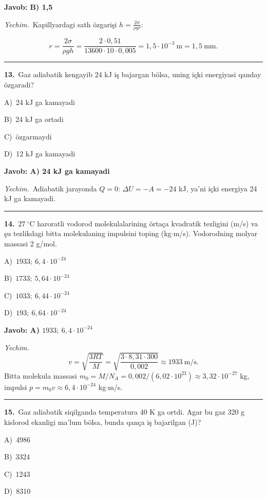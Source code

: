 \documentclass[11pt,a4paper]{article}
\newcommand{\opt}[2]{\hspace*{4mm}#1)\ #2\par}
\begin{document}
\noindent\colorbox{gray!12}{\parbox{\dimexpr\linewidth-2\fboxsep}{\textbf{Javob: B) 1,5}}}\par\smallskip
\noindent\textit{Yechim.}\ Kapillyardagi sath özgarişi $h=\frac{2\sigma}{\rho gr}$:\par
\[r=\frac{2\sigma}{\rho gh}=\frac{2\cdot0{,}51}{13600\cdot10\cdot0{,}005}=1{,}5\cdot10^{-3}\ \text{m}=1{,}5\ \text{mm}.\]\par\medskip\hrule\medskip
{}\noindent\begin{minipage}{\linewidth}
\textbf{13.}\ Gaz adiabatik kengayib 24 kJ iş bajargan bölsa, uning içki energiyasi qanday özgaradi?\par\smallskip
\opt{A}{24 kJ ga kamayadi}
\opt{B}{24 kJ ga ortadi}
\opt{C}{özgarmaydi}
\opt{D}{12 kJ ga kamayadi}
\end{minipage}\vspace{2pt}\par
\noindent\colorbox{gray!12}{\parbox{\dimexpr\linewidth-2\fboxsep}{\textbf{Javob: A) 24 kJ ga kamayadi}}}\par\smallskip
\noindent\textit{Yechim.}\ Adiabatik jarayonda $Q=0$: $\Delta U=-A=-24$ kJ, ya’ni içki energiya 24 kJ ga kamayadi.\par\par\medskip\hrule\medskip
{}\noindent\begin{minipage}{\linewidth}
\textbf{14.}\ $27\ ^\circ$C haroratli vodorod molekulalarining örtaça kvadratik tezligini (m/s) va şu tezlikdagi bitta molekulaning impulsini toping (kg$\cdot$m/s). Vodorodning molyar massasi 2 g/mol.\par\smallskip
\opt{A}{$1933;\ 6{,}4\cdot10^{-24}$}
\opt{B}{$1733;\ 5{,}64\cdot10^{-24}$}
\opt{C}{$1033;\ 6{,}44\cdot10^{-24}$}
\opt{D}{$193;\ 6{,}64\cdot10^{-24}$}
\end{minipage}\vspace{2pt}\par
\noindent\colorbox{gray!12}{\parbox{\dimexpr\linewidth-2\fboxsep}{\textbf{Javob: A) $1933;\ 6{,}4\cdot10^{-24}$}}}\par\smallskip
\noindent\textit{Yechim.}\ \[v=\sqrt{\frac{3RT}{M}}=\sqrt{\frac{3\cdot8{,}31\cdot300}{0{,}002}}\approx1933\ \text{m/s}.\]
Bitta molekula massasi $m_0=M/N_A=0{,}002/(6{,}02\cdot10^{23})\approx3{,}32\cdot10^{-27}$ kg, impulsi $p=m_0v\approx6{,}4\cdot10^{-24}$ kg$\cdot$m/s.\par\par\medskip\hrule\medskip
{}\noindent\begin{minipage}{\linewidth}
\textbf{15.}\ Gaz adiabatik siqilganda temperatura 40 K ga ortdi. Agar bu gaz 320 g kislorod ekanligi ma’lum bölsa, bunda qança iş bajarilgan (J)?\par\smallskip
\opt{A}{4986}
\opt{B}{3324}
\opt{C}{1243}
\opt{D}{8310}
\end{minipage}\vspace{2pt}\par
\end{document}
